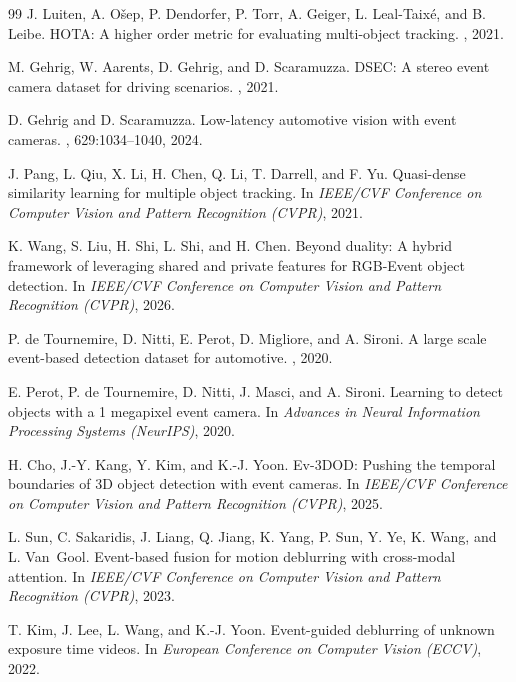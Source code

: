 \documentclass[10pt,twocolumn,letterpaper]{article}
\begin{document}
{\begin{thebibliography}{99}
J. Luiten, A. O\v{s}ep, P. Dendorfer, P. Torr, A. Geiger, L. Leal-Taix\'e, and
B. Leibe.
\newblock HOTA: A higher order metric for evaluating multi-object tracking.
, 2021.

M. Gehrig, W. Aarents, D. Gehrig, and D. Scaramuzza.
\newblock DSEC: A stereo event camera dataset for driving scenarios.
, 2021.

D. Gehrig and D. Scaramuzza.
\newblock Low-latency automotive vision with event cameras.
, 629:1034--1040, 2024.

J. Pang, L. Qiu, X. Li, H. Chen, Q. Li, T. Darrell, and F. Yu.
\newblock Quasi-dense similarity learning for multiple object tracking.
\newblock In {\em IEEE/CVF Conference on Computer Vision and Pattern Recognition
(CVPR)}, 2021.

K. Wang, S. Liu, H. Shi, L. Shi, and H. Chen.
\newblock Beyond duality: A hybrid framework of leveraging shared and private
features for RGB-Event object detection.
\newblock In {\em IEEE/CVF Conference on Computer Vision and Pattern Recognition
(CVPR)}, 2026.

P. de Tournemire, D. Nitti, E. Perot, D. Migliore, and A. Sironi.
\newblock A large scale event-based detection dataset for automotive.
, 2020.

E. Perot, P. de Tournemire, D. Nitti, J. Masci, and A. Sironi.
\newblock Learning to detect objects with a 1 megapixel event camera.
\newblock In {\em Advances in Neural Information Processing Systems (NeurIPS)},
2020.

H. Cho, J.-Y. Kang, Y. Kim, and K.-J. Yoon.
\newblock Ev-3DOD: Pushing the temporal boundaries of 3D object detection with
event cameras.
\newblock In {\em IEEE/CVF Conference on Computer Vision and Pattern Recognition
(CVPR)}, 2025.

L. Sun, C. Sakaridis, J. Liang, Q. Jiang, K. Yang, P. Sun, Y. Ye, K. Wang, and
L. Van~Gool.
\newblock Event-based fusion for motion deblurring with cross-modal attention.
\newblock In {\em IEEE/CVF Conference on Computer Vision and Pattern Recognition
(CVPR)}, 2023.

T. Kim, J. Lee, L. Wang, and K.-J. Yoon.
\newblock Event-guided deblurring of unknown exposure time videos.
\newblock In {\em European Conference on Computer Vision (ECCV)}, 2022.


\end{thebibliography}}
\end{document}
